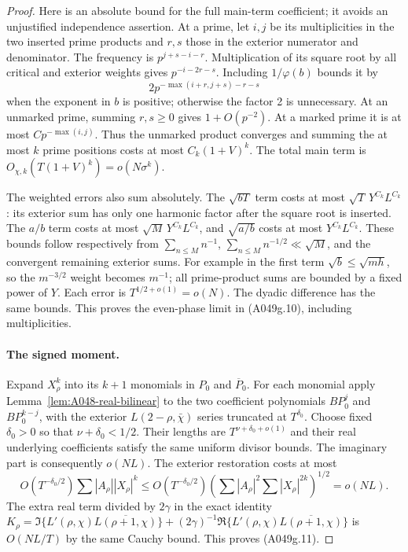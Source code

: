 \begin{proof}
Here is an absolute bound for the full main-term coefficient;
it avoids an unjustified independence assertion. At a prime,
let $i,j$ be its multiplicities in the two inserted prime
products and $r,s$ those in the exterior numerator and
denominator. The frequency is $p^{j+s-i-r}$. Multiplication
of its square root by all critical and exterior weights gives
$p^{-i-2r-s}$. Including $1/\varphi(b)$ bounds it by
\[
 2p^{-\max(i+r,j+s)-r-s}
\tag{A049g.17}
\]
when the exponent in $b$ is positive; otherwise the factor
2 is unnecessary. At an unmarked prime, summing $r,s\ge0$
gives $1+O(p^{-2})$. At a marked prime it is at most
$C p^{-\max(i,j)}$. Thus the unmarked product converges
and summing the at most $k$ prime positions costs at most
$C_k(1+V)^k$. The total main term is
$O_{\chi,k}(T(1+V)^k)=o(N\sigma^k)$.

The weighted errors also sum absolutely. The $\sqrt{bT}$
term costs at most $\sqrt T\,Y^{C_k}L^{C_k}$: its exterior
sum has only one harmonic factor after the square root is
inserted. The $a/b$ term costs at most
$\sqrt M\,Y^{C_k}L^{C_k}$, and $\sqrt{a/b}$ costs at most
$Y^{C_k}L^{C_k}$. These bounds follow respectively from
$\sum_{n\le M}n^{-1}$, $\sum_{n\le M}n^{-1/2}\ll\sqrt M$,
and the convergent remaining exterior sums. For example in
the first term $\sqrt b\le\sqrt{m h}$, so the $m^{-3/2}$
weight becomes $m^{-1}$; all prime-product sums are bounded
by a fixed power of $Y$. Each error is $T^{1/2+o(1)}=o(N)$.
The dyadic difference has the same bounds. This proves the
even-phase limit in (A049g.10), including multiplicities.

\paragraph{The signed moment.}
Expand $X_\rho^k$ into its $k+1$ monomials in $P_0$ and
$\overline P_0$. For each monomial apply
Lemma~\ref{lem:A048-real-bilinear} to the two coefficient
polynomials $BP_0^j$ and $BP_0^{k-j}$, with the exterior
$L(2-\rho,\bar\chi)$ series truncated at $T^{\delta_0}$.
Choose fixed $\delta_0>0$ so that $\nu+\delta_0<1/2$.
Their lengths are $T^{\nu+\delta_0+o(1)}$ and their real
underlying coefficients satisfy the same uniform divisor
bounds. The imaginary part is consequently $o(NL)$.
The exterior restoration costs at most
\[
 O(T^{-\delta_0/2})\sum|A_\rho||X_\rho|^k
 \le O(T^{-\delta_0/2})
       \left(\sum|A_\rho|^2\sum|X_\rho|^{2k}\right)^{1/2}
                         =o(NL).
\]
The extra real term divided by $2\gamma$ in the exact identity
$K_\rho=\Im\{L'(\rho,\chi)\overline{L(\rho+1,\chi)}\}
+(2\gamma)^{-1}\Re\{L'(\rho,\chi)\overline{L(\rho+1,\chi)}\}$
is $O(NL/T)$ by the same Cauchy bound. This proves (A049g.11).
\end{proof}

